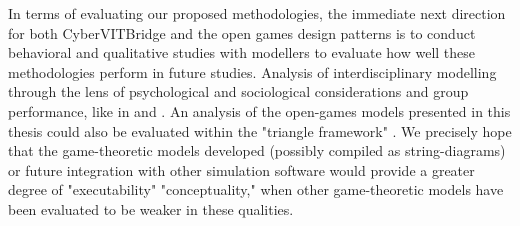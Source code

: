 In terms of evaluating our proposed methodologies, the immediate next direction for both CyberVITBridge and the open games design patterns is to conduct behavioral and qualitative studies with modellers to evaluate how well these methodologies perform in future studies. Analysis of interdisciplinary modelling through the lens of psychological and sociological considerations and group performance, like in \cite{nikolicFacilitatingInterdisciplinaryModelling2007} and \cite{rossiniFrameworksIntegratingInterdisciplinary1979}. An analysis of the open-games models presented in this thesis could also be evaluated within the "triangle framework" \cite{caulfieldMetamodellingEcosystemsSecurity2022}. We precisely hope that the game-theoretic models developed (possibly compiled as string-diagrams) or future integration with other simulation software would provide a greater degree of "executability" "conceptuality," when other game-theoretic models have been evaluated to be weaker in these qualities.     